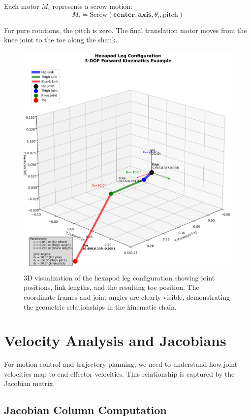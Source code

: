 \documentclass[11pt]{article}
\begin{document}
Each motor $M_i$ represents a screw motion:
\[M_i = \text{Screw}(\mathbf{center}, \mathbf{axis}, \theta_i, \text{pitch})\]

For pure rotations, the pitch is zero. The final translation motor moves from the knee joint to the toe along the shank.

\begin{figure}[H]
    \centering
    \includegraphics[width=\textwidth]{illustrations/leg_configuration-py.png}
    \caption{3D visualization of the hexapod leg configuration showing joint positions, link lengths, and the resulting toe position. The coordinate frames and joint angles are clearly visible, demonstrating the geometric relationships in the kinematic chain.}
    \label{fig:leg_config}
\end{figure}

\section{Velocity Analysis and Jacobians}

For motion control and trajectory planning, we need to understand how joint velocities map to end-effector velocities. This relationship is captured by the Jacobian matrix.

\subsection{Jacobian Column Computation}
\end{document}
